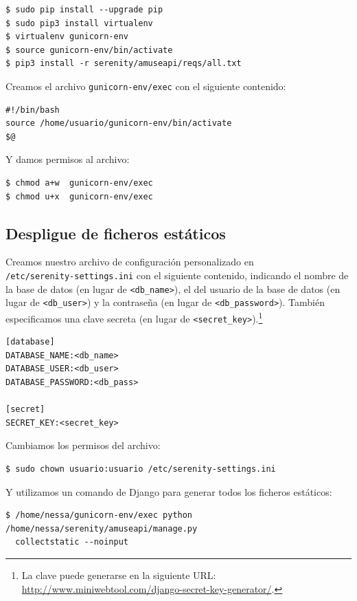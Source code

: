 \begin{verbatim}
$ sudo pip install --upgrade pip
$ sudo pip3 install virtualenv
$ virtualenv gunicorn-env
$ source gunicorn-env/bin/activate
$ pip3 install -r serenity/amuseapi/reqs/all.txt
\end{verbatim}

Creamos el archivo \texttt{gunicorn-env/exec} con el siguiente contenido:

\begin{verbatim}
#!/bin/bash
source /home/usuario/gunicorn-env/bin/activate
$@
\end{verbatim}

Y damos permisos al archivo:

\begin{verbatim}
$ chmod a+w  gunicorn-env/exec 
$ chmod u+x  gunicorn-env/exec
\end{verbatim}


\subsection{Despligue de ficheros estáticos}

Creamos nuestro archivo de configuración personalizado en
\\ \texttt{/etc/serenity-settings.ini}
con el siguiente contenido, indicando el nombre de la base de datos (en lugar de
\texttt{<db\_name>}), el del usuario de la base de datos (en lugar de
\texttt{<db\_user>}) y la contraseña (en lugar de \texttt{<db\_password>}).
También especificamos una clave secreta (en lugar de
\texttt{<secret\_key>}).\footnote{La clave puede generarse en la siguiente URL:
  \url{http://www.miniwebtool.com/django-secret-key-generator/}.}

\begin{verbatim}
[database]
DATABASE_NAME:<db_name>
DATABASE_USER:<db_user>
DATABASE_PASSWORD:<db_pass>

[secret]
SECRET_KEY:<secret_key>
\end{verbatim}

Cambiamos los permisos del archivo:

\begin{verbatim}
$ sudo chown usuario:usuario /etc/serenity-settings.ini
\end{verbatim}

Y utilizamos un comando de Django para generar todos los ficheros estáticos:

\begin{verbatim}
$ /home/nessa/gunicorn-env/exec python /home/nessa/serenity/amuseapi/manage.py
  collectstatic --noinput
\end{verbatim}

